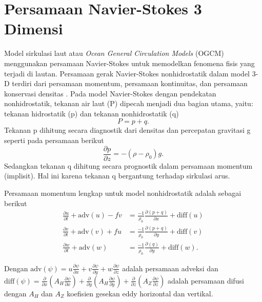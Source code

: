 \section[Persamaan Navier-Stokes 3 Dimensi]{Persamaan Navier-Stokes 3 Dimensi}
\begin{spacing}{1.5}
	\par Model sirkulasi laut atau \textit{Ocean General Circulation Models} (OGCM) menggunakan persamaan Navier-Stokes untuk memodelkan fenomena fisis yang terjadi di lautan. Persamaan gerak Navier-Stokes nonhidrostatik dalam model 3-D terdiri dari persamaan momentum, persamaan kontinuitas, dan persamaan konservasi densitas . Pada model Navier-Stokes dengan pendekatan nonhidrostatik, tekanan air laut (P) dipecah menjadi dua bagian utama, yaitu: tekanan hidrostatik (p) dan tekanan nonhidrostatik (q)
	\begin{equation}
		P = p+q.
	\end{equation}
	Tekanan p dihitung secara diagnostik dari densitas  dan percepatan gravitasi g seperti pada persamaan berikut 
	\begin{equation}
		\frac{\partial p}{\partial z} = -(\rho - \rho_0)g.
	\end{equation}
	Sedangkan tekanan q dihitung secara prognostik dalam persamaan momentum (implisit). Hal ini karena tekanan q bergantung terhadap sirkulasi arus.
	\par Persamaan momentum lengkap untuk model nonhidrostatik adalah sebagai berikut
	\begin{equation}
		\begin{aligned}
			\frac{\partial u}{\partial t} + \text{adv}(u)-fv &= \frac{-1}{\rho_0}\frac{\partial(p+q)}{\partial x}+\text{diff}(u) \\
			\frac{\partial v}{\partial t} + \text{adv}(v)+fu &= \frac{-1}{\rho_0}\frac{\partial(p+q)}{\partial y}+\text{diff}(v) \\
			\frac{\partial w}{\partial t} +\text{adv}(w) &= \frac{-1}{\rho_0}\frac{\partial(q)}{\partial y}+\text{diff}(w).
		\end{aligned}	
	\end{equation}
	\par Dengan $\text{adv}(\psi)=u\frac{\partial \psi}{\partial x}+v\frac{\partial \psi}{\partial y}+w\frac{\partial \psi}{\partial z}$ adalah persamaan adveksi dan $\text{diff}(\psi)=\frac{\partial}{\partial x}(A_{H} \frac{\partial \psi}{\partial x})+\frac{\partial}{\partial y}(A_{H} \frac{\partial \psi}{\partial y})+\frac{\partial}{\partial z}(A_{Z} \frac{\partial \psi}{\partial z})$ adalah persamaan difusi dengan $A_H$ dan $A_Z$ koefisien gesekan eddy horizontal dan vertikal. 

\end{spacing}
